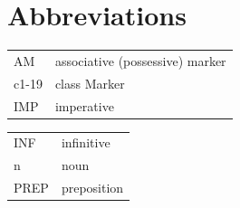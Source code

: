 \documentclass[output=paper,modfonts,nonflat,
 hidelinks
]{langsci/langscibook}
\begin{document}
\section*{Abbreviations}
\begin{tabularx}{.55\textwidth}{ll}
AM & associative (possessive) marker \\
c1-19 & class Marker \\
IMP & imperative \\
\end{tabularx}
\begin{tabularx}{.45\textwidth}{ll}
INF & infinitive\\
n & noun\\
PREP & preposition\\
\end{tabularx}







\sloppy
\printbibliography[heading=subbibliography,notkeyword=this]
\end{document}
